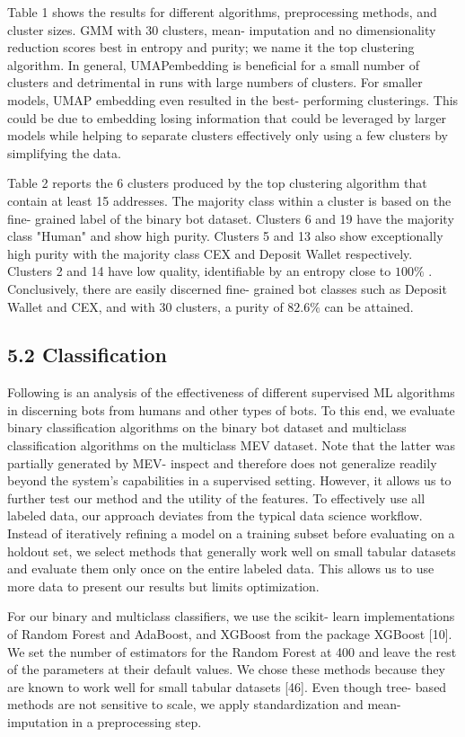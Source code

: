 Table 1 shows the results for different algorithms, preprocessing methods, and cluster sizes. GMM with 30 clusters, mean- imputation and no dimensionality reduction scores best in entropy and purity; we name it the top clustering algorithm. In general, UMAPembedding is beneficial for a small number of clusters and detrimental in runs with large numbers of clusters. For smaller models, UMAP embedding even resulted in the best- performing clusterings. This could be due to embedding losing information that could be leveraged by larger models while helping to separate clusters effectively only using a few clusters by simplifying the data.

Table 2 reports the 6 clusters produced by the top clustering algorithm that contain at least 15 addresses. The majority class within a cluster is based on the fine- grained label of the binary bot dataset. Clusters 6 and 19 have the majority class "Human" and show high purity. Clusters 5 and 13 also show exceptionally high purity with the majority class CEX and Deposit Wallet respectively. Clusters 2 and 14 have low quality, identifiable by an entropy close to \(100\%\) . Conclusively, there are easily discerned fine- grained bot classes such as Deposit Wallet and CEX, and with 30 clusters, a purity of \(82.6\%\) can be attained.

\subsection*{5.2 Classification}

Following is an analysis of the effectiveness of different supervised ML algorithms in discerning bots from humans and other types of bots. To this end, we evaluate binary classification algorithms on the binary bot dataset and multiclass classification algorithms on the multiclass MEV dataset. Note that the latter was partially generated by MEV- inspect and therefore does not generalize readily beyond the system's capabilities in a supervised setting. However, it allows us to further test our method and the utility of the features. To effectively use all labeled data, our approach deviates from the typical data science workflow. Instead of iteratively refining a model on a training subset before evaluating on a holdout set, we select methods that generally work well on small tabular datasets and evaluate them only once on the entire labeled data. This allows us to use more data to present our results but limits optimization.

For our binary and multiclass classifiers, we use the scikit- learn implementations of Random Forest and AdaBoost, and XGBoost from the package XGBoost [10]. We set the number of estimators for the Random Forest at 400 and leave the rest of the parameters at their default values. We chose these methods because they are known to work well for small tabular datasets [46]. Even though tree- based methods are not sensitive to scale, we apply standardization and mean- imputation in a preprocessing step.

